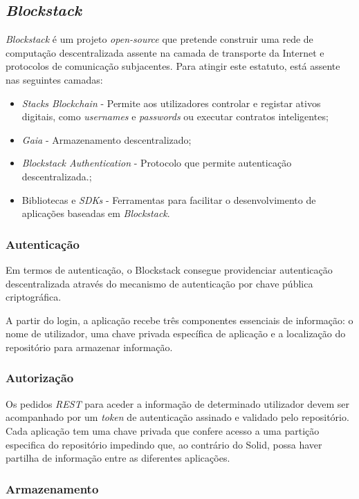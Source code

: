 \subsection{\emph{Blockstack}}
\emph{Blockstack} é um projeto \emph{open-source} que pretende construir uma rede de computação descentralizada assente na camada de transporte da Internet e protocolos de comunicação subjacentes. Para atingir este estatuto, está assente nas seguintes camadas:
\begin{itemize}
	\item \emph{Stacks Blockchain} - Permite aos utilizadores controlar e registar ativos digitais, como \emph{usernames} e \emph{passwords} ou executar contratos inteligentes\cite{blockstack_white_paper};
	\item \emph{Gaia} - Armazenamento descentralizado;
	\item \emph{Blockstack Authentication} - Protocolo que permite autenticação descentralizada.\cite{blockstack_white_paper};
	\item Bibliotecas e \emph{SDKs} - Ferramentas para facilitar o desenvolvimento de aplicações baseadas em \emph{Blockstack}\cite{blockstack_white_paper}.
\end{itemize}

\subsubsection*{Autenticação}
Em termos de autenticação, o Blockstack consegue providenciar autenticação descentralizada através do mecanismo de autenticação por chave pública criptográfica. 

A partir do login, a aplicação recebe três componentes essenciais de informação: o nome de utilizador, uma chave privada específica de aplicação e a localização do repositório para armazenar informação\cite{blockstack_white_paper}.

\subsubsection*{Autorização}
Os pedidos \emph{\acrshort{REST}} para aceder a informação de determinado utilizador devem ser acompanhado por um \emph{token} de autenticação assinado e validado pelo repositório. Cada aplicação tem uma chave privada que confere acesso a uma partição especifica do repositório impedindo que, ao contrário do Solid, possa haver partilha de informação entre as diferentes aplicações.

\subsubsection*{Armazenamento}

